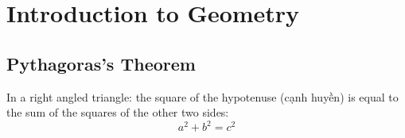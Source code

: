 \chapter{Introduction to Geometry}

\section{Pythagoras's Theorem}

In a right angled triangle: the square of the hypotenuse (cạnh huyền) is equal to the sum of the squares of the other two sides:$$a^2 + b^2 = c^2$$